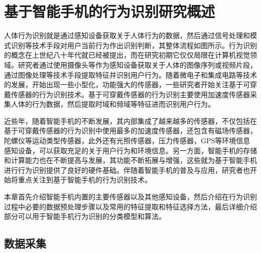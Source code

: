 \chapter{基于智能手机的行为识别研究概述}
\par 人体行为识别就是通过感知设备获取关于人体行为的数据，然后通过信号处理和模式识别等技术手段对用户当前行为作出识别判断，其整体流程如图所示。行为识别的概念在上世纪八十年代就已经被提出，而在研究初期它仅仅局限在计算机视觉领域。研究者通过使用摄像头等作为感知设备获取关于人体的图像序列或视频片段，通过图像处理等技术手段提取特征并识别用户行为。随着微电子和集成电路等技术的发展，开始出现一些小型化，功能强大的传感器，一些研究者开始关注基于可穿戴传感器的行为识别技术。基于可穿戴传感器的行为识别主要使用加速度传感器采集人体的行为数据，然后提取时域和频域等特征进而识别用户行为。
\par 近些年，随着智能手机的不断发展，其内部集成了越来越多的传感器，不仅包括在基于可穿戴传感器的行为识别中使用最多的加速度传感器，还包含有磁场传感器，陀螺仪等运动类型传感器，此外还有光照传感器，压力传感器，GPS等环境信息感知设备，可以获取充足的关于用户行为和环境信息。另一方面，智能手机的存储和计算能力也在不断提高与发展，其功能不断拓展与增强，这些就为基于智能手机进行行为识别提供了良好的硬件基础。伴随着智能手机的普及与应用，研究者也开始将重点关注到基于智能手机的行为识别技术。
\par 本章首先介绍智能手机内置的主要传感器以及其他感知设备，然后介绍在行为识别过程中必要的数据预处理步骤以及常用的特征提取和特征选择方法，最后详细介绍部分可以用于智能手机行为识别的分类模型和算法。

\section{数据采集}
